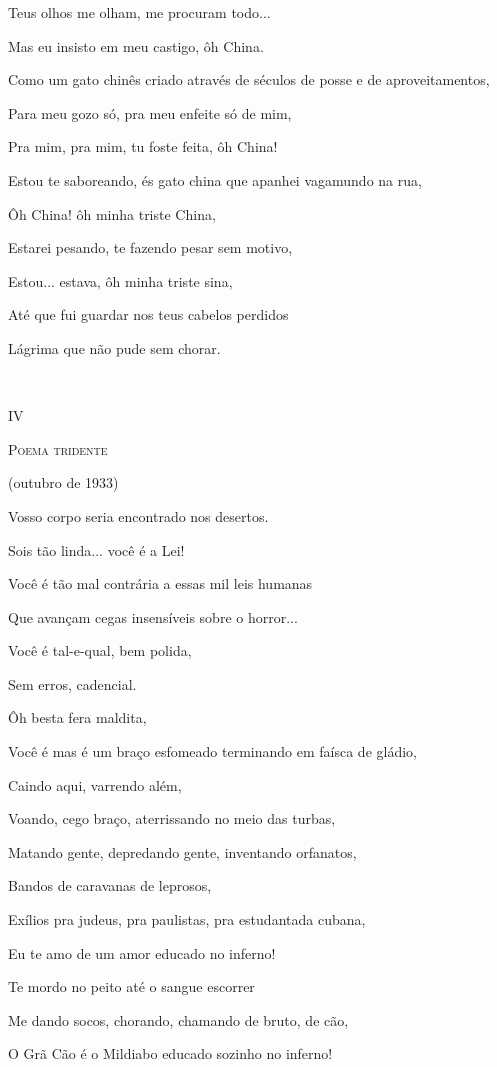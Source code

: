 Teus olhos me olham, me procuram todo...

Mas eu insisto em meu castigo, ôh China.

Como um gato chinês criado através de séculos de posse e de
aproveitamentos,

Para meu gozo só, pra meu enfeite só de mim,

Pra mim, pra mim, tu foste feita, ôh China!

Estou te saboreando, és gato china que apanhei vagamundo na rua,

Ôh China! ôh minha triste China,

Estarei pesando, te fazendo pesar sem motivo,

Estou... estava, ôh minha triste sina,

Até que fui guardar nos teus cabelos perdidos

Lágrima que não pude sem chorar.

\emph{\\
}

IV

\textsc{Poema tridente}

(outubro de 1933)

Vosso corpo seria encontrado nos desertos.

Sois tão linda... você é a Lei!

Você é tão mal contrária a essas mil leis humanas

Que avançam cegas insensíveis sobre o horror...

Você é tal-e-qual, bem polida,

Sem erros, cadencial.

Ôh besta fera maldita,

Você é mas é um braço esfomeado terminando em faísca de gládio,

Caindo aqui, varrendo além,

Voando, cego braço, aterrissando no meio das turbas,

Matando gente, depredando gente, inventando orfanatos,

Bandos de caravanas de leprosos,

Exílios pra judeus, pra paulistas, pra estudantada cubana,

Eu te amo de um amor educado no inferno!

Te mordo no peito até o sangue escorrer

Me dando socos, chorando, chamando de bruto, de cão,

O Grã Cão é o Mildiabo educado sozinho no inferno!


